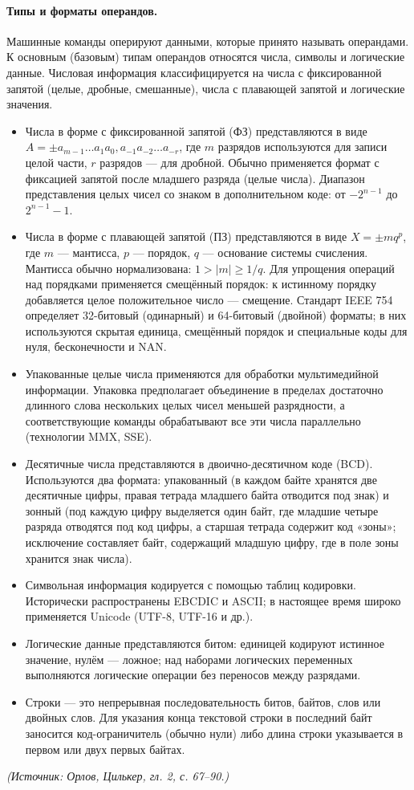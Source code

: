 \documentclass[a4paper,12pt]{article}
\begin{document}
\paragraph{Типы и форматы операндов.}
Машинные команды оперируют данными, которые принято называть операндами. К основным (базовым) типам операндов относятся числа, символы и логические данные. Числовая информация классифицируется на числа с фиксированной запятой (целые, дробные, смешанные), числа с плавающей запятой и логические значения.
\begin{itemize}
\item Числа в форме с фиксированной запятой (ФЗ) представляются в виде \(A=\pm a_{m-1}\ldots a_1a_0,a_{-1}a_{-2}\ldots a_{-r}\), где \(m\) разрядов используются для записи целой части, \(r\) разрядов --- для дробной. Обычно применяется формат с фиксацией запятой после младшего разряда (целые числа). Диапазон представления целых чисел со знаком в дополнительном коде: от \(-2^{n-1}\) до \(2^{n-1}-1\).
\item Числа в форме с плавающей запятой (ПЗ) представляются в виде \(X=\pm m q^{p}\), где \(m\) --- мантисса, \(p\) --- порядок, \(q\) --- основание системы счисления. Мантисса обычно нормализована: \(1>|m|\ge 1/q\). Для упрощения операций над порядками применяется смещённый порядок: к истинному порядку добавляется целое положительное число --- смещение. Стандарт IEEE 754 определяет 32-битовый (одинарный) и 64-битовый (двойной) форматы; в них используются скрытая единица, смещённый порядок и специальные коды для нуля, бесконечности и NAN.
\item Упакованные целые числа применяются для обработки мультимедийной информации. Упаковка предполагает объединение в пределах достаточно длинного слова нескольких целых чисел меньшей разрядности, а соответствующие команды обрабатывают все эти числа параллельно (технологии MMX, SSE).
\item Десятичные числа представляются в двоично-десятичном коде (BCD). Используются два формата: упакованный (в каждом байте хранятся две десятичные цифры, правая тетрада младшего байта отводится под знак) и зонный (под каждую цифру выделяется один байт, где младшие четыре разряда отводятся под код цифры, а старшая тетрада содержит код «зоны»; исключение составляет байт, содержащий младшую цифру, где в поле зоны хранится знак числа).
\item Символьная информация кодируется с помощью таблиц кодировки. Исторически распространены EBCDIC и ASCII; в настоящее время широко применяется Unicode (UTF-8, UTF-16 и др.).
\item Логические данные представляются битом: единицей кодируют истинное значение, нулём --- ложное; над наборами логических переменных выполняются логические операции без переносов между разрядами.
\item Строки --- это непрерывная последовательность битов, байтов, слов или двойных слов. Для указания конца текстовой строки в последний байт заносится код-ограничитель (обычно нули) либо длина строки указывается в первом или двух первых байтах.
\end{itemize}
\textit{(Источник: Орлов, Цилькер, гл. 2, с. 67--90.)}
\end{document}
